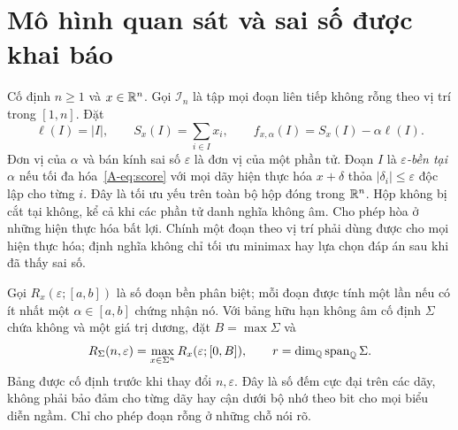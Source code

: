 \section{Mô hình quan sát và sai số được khai báo}
Cố định $n\ge1$ và $x\in\mathbb R^n$. Gọi $\mathcal I_n$ là tập mọi đoạn liên tiếp không rỗng theo vị trí trong $[1,n]$. Đặt
\begin{equation}\label{A-eq:score}
\ell(I)=|I|,\qquad S_x(I)=\sum_{i\in I}x_i,\qquad
f_{x,\alpha}(I)=S_x(I)-\alpha\ell(I).
\end{equation}
Đơn vị của $\alpha$ và bán kính sai số $\varepsilon$ là đơn vị của một phần tử. Đoạn $I$ là \emph{$\varepsilon$-bền tại $\alpha$} nếu tối đa hóa~\eqref{A-eq:score} với mọi dãy hiện thực hóa $x+\delta$ thỏa $|\delta_i|\le\varepsilon$ độc lập cho từng $i$. Đây là tối ưu yếu trên toàn bộ hộp đóng trong $\mathbb R^n$. Hộp không bị cắt tại không, kể cả khi các phần tử danh nghĩa không âm. Cho phép hòa ở những hiện thực hóa bất lợi. Chính một đoạn theo vị trí phải dùng được cho mọi hiện thực hóa; định nghĩa không chỉ tối ưu minimax hay lựa chọn đáp án sau khi đã thấy sai số.

Gọi $R_x(\varepsilon;[a,b])$ là số đoạn bền phân biệt; mỗi đoạn được tính một lần nếu có ít nhất một $\alpha\in[a,b]$ chứng nhận nó. Với bảng hữu hạn không âm cố định $\Sigma$ chứa không và một giá trị dương, đặt $B=\max\Sigma$ và
\begin{equation}\label{A-eq:count}
R_\Sigma(n,\varepsilon)=\max_{x\in\Sigma^n}R_x(\varepsilon;[0,B]),
\qquad r=\dim_\mathbb Q\operatorname{span}_\mathbb Q\Sigma.
\end{equation}
Bảng được cố định trước khi thay đổi $n,\varepsilon$. Đây là số đếm cực đại trên các dãy, không phải bảo đảm cho từng dãy hay cận dưới bộ nhớ theo bit cho mọi biểu diễn ngầm. Chỉ cho phép đoạn rỗng ở những chỗ nói rõ.

